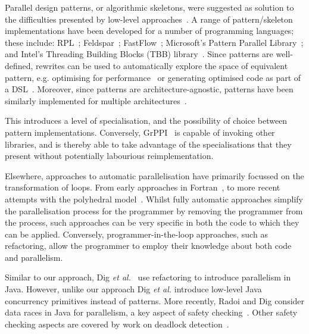 Parallel design patterns, or algorithmic skeletons, were suggested as solution to the difficulties presented by low-level approaches~\cite{Asanovic:2009:VPC,DBLP:journals/spe/Gonzalez-VelezL10}.
A range of pattern/skeleton implementations have been developed for a number of programming languages; these include: RPL~\cite{DBLP:conf/pdp/JanjicBMHDAG16}; Feldspar~\cite{DBLP:conf/ifl/AxelssonCSSEP10}; FastFlow~\cite{DBLP:journals/mis/JinLWY15}; Microsoft's Pattern Parallel Library~\cite{ACM:book/msoft/CampbellM11}; and Intel's Threading Building Blocks (TBB) library~\cite{DBLP:reference/parallel/X11pz}.
Since patterns are well-defined, rewrites can be used to automatically explore the space of equivalent pattern, e.g. optimising for performance~\cite{DBLP:conf/europar/MatsuzakiKIHA04,DBLP:conf/ipps/GorlatchWL99} or generating optimised code as part of a DSL~\cite{DBLP:conf/dagstuhl/Gorlatch03}. Moreover, since patterns are architecture-agnostic, patterns have been similarly implemented for multiple architectures~\cite{DBLP:conf/cgo/HagedornSSGD18,DBLP:conf/parco/ReyesL15}.

This introduces a level of specialisation, and the possibility of choice between pattern implementations. Conversely, GrPPI~\cite{DBLP:journals/concurrency/AstorgaD0G17} is capable of invoking other libraries, and is thereby able to take advantage of the specialisations that they present without potentially labourious reimplementation.


Elsewhere, approaches to automatic parallelisation have primarily focussed on the transformation of loops. From early approaches in Fortran~\cite{DBLP:journals/cacm/Lamport74}, to more recent attempts with the polyhedral model~\cite{DBLP:conf/ppopp/AncourtI91}. Whilst fully automatic approaches simplify the parallelisation process for the programmer by removing the programmer from the process, such approaches can be very specific in both the code to which they can be applied. Conversely, programmer-in-the-loop approaches, such as refactoring, allow the programmer to employ their knowledge about both code and parallelism.

Similar to our approach, Dig \textit{et al.}~\cite{dig} use refactoring to introduce parallelism in Java. However, unlike our approach Dig \textit{et al.} introduce low-level Java concurrency primitives instead of patterns. More recently,  Radoi and Dig consider data races in Java for parallelism, a key aspect of safety checking~\cite{DBLP:journals/tosem/RadoiD15}. Other safety checking aspects are covered by work on deadlock detection~\cite{DBLP:journals/tse/Corbett96}.


